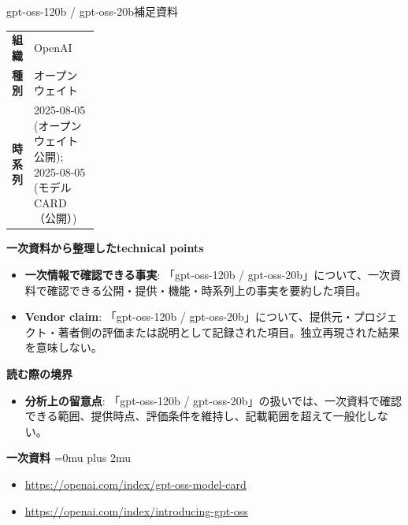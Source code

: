 \begin{technicalnote}{gpt-oss-120b / gpt-oss-20b}{補足資料}
\begingroup
\begin{tabularx}{\linewidth}{@{}>{\bfseries}p{0.22\linewidth}X@{}}
組織 & OpenAI \\
種別 & オープンウェイト \\
時系列 & 2025-08-05 (オープンウェイト公開); 2025-08-05 (モデル CARD（公開）) \\
\end{tabularx}
\smallskip
{\bfseries 一次資料から整理したtechnical points}
\begin{itemize}[leftmargin=1.5em,itemsep=0.35em]
\item \textbf{一次情報で確認できる事実}: 「gpt-oss-120b / gpt-oss-20b」について、一次資料で確認できる公開・提供・機能・時系列上の事実を要約した項目。
\item \textbf{Vendor claim}: 「gpt-oss-120b / gpt-oss-20b」について、提供元・プロジェクト・著者側の評価または説明として記録された項目。独立再現された結果を意味しない。
\end{itemize}
\begin{minipage}{\linewidth}
{\bfseries 読む際の境界}
\begin{itemize}[leftmargin=1.5em,itemsep=0.35em]
\item \textbf{分析上の留意点}: 「gpt-oss-120b / gpt-oss-20b」の扱いでは、一次資料で確認できる範囲、提供時点、評価条件を維持し、記載範囲を超えて一般化しない。
\end{itemize}
\begin{samepage}
{\bfseries 一次資料}
\begingroup\sloppy
\Urlmuskip=0mu plus 2mu\relax
\begin{itemize}[leftmargin=1.5em,itemsep=0.25em]
\item {\scriptsize\url{https://openai.com/index/gpt-oss-model-card}}
\item {\scriptsize\url{https://openai.com/index/introducing-gpt-oss}}
\end{itemize}
\endgroup
\end{samepage}
\end{minipage}
\endgroup
\end{technicalnote}
\medskip

